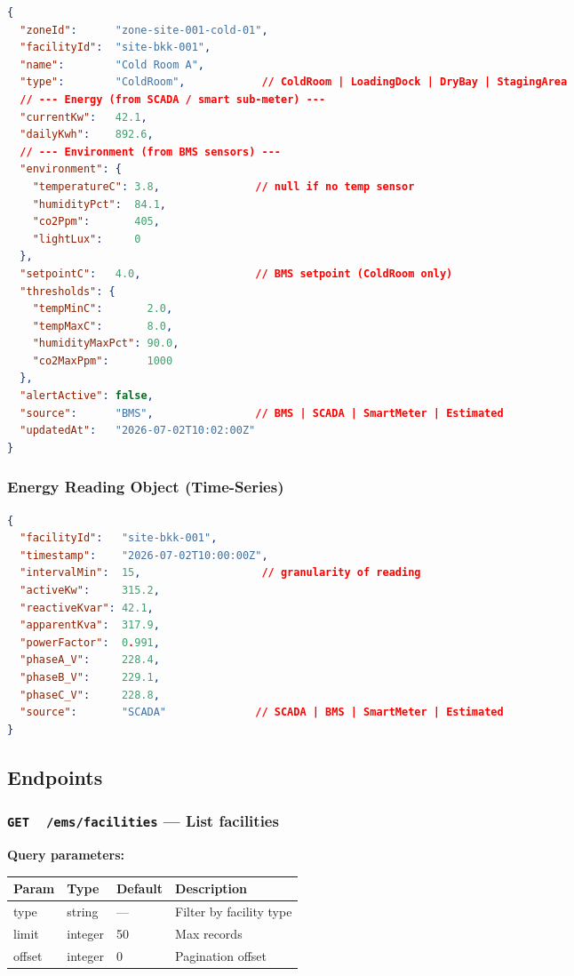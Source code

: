 \documentclass{article}
\newcommand{\GET}{\colorbox{evblue!20}{\texttt{\textbf{\color{evblue}GET}}}}
\begin{document}
\begin{lstlisting}[language=json, caption=EMS zone object schema]
{
  "zoneId":      "zone-site-001-cold-01",
  "facilityId":  "site-bkk-001",
  "name":        "Cold Room A",
  "type":        "ColdRoom",            // ColdRoom | LoadingDock | DryBay | StagingArea
  // --- Energy (from SCADA / smart sub-meter) ---
  "currentKw":   42.1,
  "dailyKwh":    892.6,
  // --- Environment (from BMS sensors) ---
  "environment": {
    "temperatureC": 3.8,               // null if no temp sensor
    "humidityPct":  84.1,
    "co2Ppm":       405,
    "lightLux":     0
  },
  "setpointC":   4.0,                  // BMS setpoint (ColdRoom only)
  "thresholds": {
    "tempMinC":       2.0,
    "tempMaxC":       8.0,
    "humidityMaxPct": 90.0,
    "co2MaxPpm":      1000
  },
  "alertActive": false,
  "source":      "BMS",                // BMS | SCADA | SmartMeter | Estimated
  "updatedAt":   "2026-07-02T10:02:00Z"
}
\end{lstlisting}

\subsubsection{Energy Reading Object (Time-Series)}

\begin{lstlisting}[language=json, caption=Facility-level energy reading schema]
{
  "facilityId":   "site-bkk-001",
  "timestamp":    "2026-07-02T10:00:00Z",
  "intervalMin":  15,                   // granularity of reading
  "activeKw":     315.2,
  "reactiveKvar": 42.1,
  "apparentKva":  317.9,
  "powerFactor":  0.991,
  "phaseA_V":     228.4,
  "phaseB_V":     229.1,
  "phaseC_V":     228.8,
  "source":       "SCADA"              // SCADA | BMS | SmartMeter | Estimated
}
\end{lstlisting}

\subsection{Endpoints}

\subsubsection{\GET\ \ \texttt{/ems/facilities} --- List facilities}

\textbf{Query parameters:}

\begin{center}
\begin{tabular}{>{\ttfamily}llll}
\toprule
\textbf{Param} & \textbf{Type} & \textbf{Default} & \textbf{Description}\\
\midrule
type    & string  & ---    & Filter by facility type\\
limit   & integer & 50   & Max records\\
offset  & integer & 0    & Pagination offset\\
\bottomrule
\end{tabular}
\end{center}
\end{document}

